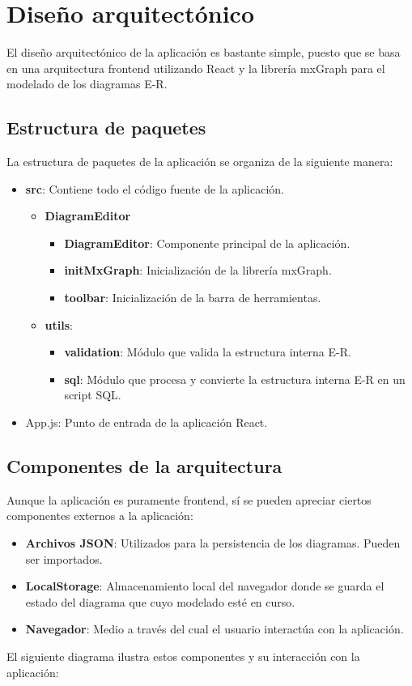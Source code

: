 \section{Diseño arquitectónico}
El diseño arquitectónico de la aplicación es bastante simple, puesto que se basa en una arquitectura frontend utilizando React y la librería mxGraph para el modelado de los diagramas E-R.

\subsection{Estructura de paquetes}
La estructura de paquetes de la aplicación se organiza de la siguiente manera:

\begin{itemize}
    \item \textbf{src}: Contiene todo el código fuente de la aplicación.
    \begin{itemize}
        \item \textbf{DiagramEditor}
        \begin{itemize}
            \item \textbf{DiagramEditor}: Componente principal de la aplicación.
            \item \textbf{initMxGraph}: Inicialización de la librería mxGraph.
            \item \textbf{toolbar}: Inicialización de la barra de herramientas.
            \end{itemize}
        \item \textbf{utils}:
        \begin{itemize}
            \item \textbf{validation}: Módulo que valida la estructura interna E-R.
            \item \textbf{sql}: Módulo que procesa y convierte la estructura interna E-R en un script SQL.
        \end{itemize}
    \end{itemize}
    \item App.js: Punto de entrada de la aplicación React.
\end{itemize}

\subsection{Componentes de la arquitectura}
Aunque la aplicación es puramente frontend, sí se pueden apreciar ciertos componentes externos a la aplicación:
\begin{itemize}
    \item \textbf{Archivos JSON}: Utilizados para la persistencia de los diagramas. Pueden ser importados.
    \item \textbf{LocalStorage}: Almacenamiento local del navegador donde se guarda el estado del diagrama que cuyo modelado esté en curso.
    \item \textbf{Navegador}: Medio a través del cual el usuario interactúa con la aplicación.
\end{itemize}

El siguiente diagrama ilustra estos componentes y su interacción con la aplicación:


